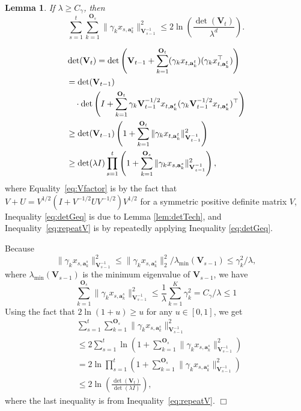 \documentclass{article}
\newcommand{\ba}{\mathbf{a}}
\newcommand{\bO}{\mathbf{O}}
\newcommand{\bV}{\mathbf{V}}
\newcommand{\norm}[1]{\| #1 \|}
\newtheorem{lemma}[theorem]{Lemma}%
\newenvironment{proof}{\noindent {\textbf{Proof. }}}{$\Box$ \medskip}
\begin{document}
\begin{lemma}
\label{lem:SumXiEstimateInDet}
If $\lambda \geq C_\gamma$, then
$$
\sum_{s=1}^t \sum_{k=1}^{\bO_s} \norm{\gamma_k x_{s,\ba_{k}^s}}_{\bV_{s-1}^{-1}}^2 \leq 2\ln \left(\frac{\det(\bV_t)}{\lambda^d} \right).
$$
\end{lemma}
\begin{proof}
\begin{align}
&\det(\bV_t) = \det\left(\bV_{t-1} + \sum_{k=1}^{\bO_t} (\gamma_k x_{t,\ba_k^{t}})(\gamma_k x_{t, \ba_k^{t}}^{\top}) \right) \nonumber \\
&=\det(\bV_{t-1}) \notag \\
&~~~\cdot \det \left(I + \sum_{k=1}^{\bO_t} \gamma_k \bV_{t-1}^{-1/2}x_{t,\ba_{k}^{t}} (\gamma_k \bV_{t-1}^{-1/2}x_{t,\ba_{k}^{t}})^{\top} \right) \label{eq:Vfactor}\\
&\geq \det(\bV_{t-1}) \left(1 + \sum_{k=1}^{\bO_t} \norm{\gamma_k x_{t,\ba_k^t}}_{\bV_{t-1}^{-1}}^2 \right) \label{eq:detGeq} \\
&\geq \det(\lambda I)\prod_{s=1}^{t} \left(1 + \sum_{k=1}^{\bO_s} \norm{\gamma_k x_{s,\ba_k^s}}_{\bV_{s-1}^{-1}}^2 \right), \label{eq:repeatV}
\end{align}
where Equality~\eqref{eq:Vfactor} is by the fact that
	$V+U = V^{1/2} (I + V^{-1/2} U V^{-1/2}) V^{1/2}$ for a symmetric positive definite
	matrix $V$, Inequality \eqref{eq:detGeq} is due to Lemma \ref{lem:detTech}, and
	Inequality~\eqref{eq:repeatV} is by repeatedly applying Inequality
	\eqref{eq:detGeq}.

Because
$$
\norm{\gamma_k x_{s,\ba_k^s}}_{\bV_{s-1}^{-1}}^2 \leq \norm{\gamma_k x_{s,\ba_k^s}}_2^2/\lambda_{\min}(\bV_{s-1}) \leq \gamma_k^2 /\lambda,
$$
where $\lambda_{\min}(\bV_{s-1})$ is the minimum eigenvalue of
	$\bV_{s-1}$,  we have 
$$
\sum_{k=1}^{\bO_s} \norm{\gamma_k x_{s,\ba_k^s}}_{\bV_{s-1}^{-1}}^2 \leq \frac{1}{\lambda} \sum_{k=1}^{K} \gamma_k^2 = C_\gamma /\lambda \leq 1
$$
Using the fact that $ 2\ln(1+u) \geq u$ for any $u \in [0,1]$, we get
\begin{align*}
&\sum_{s=1}^t \sum_{k=1}^{\bO_s}\norm{\gamma_k x_{s,\ba_{k}^s}}_{\bV_{s-1}^{-1}}^2 \\
&\leq 2\sum_{s=1}^t\ln \left(1 + \sum_{k=1}^{\bO_s} \norm{\gamma_k x_{s,\ba_k^s}}_{\bV_{s-1}^{-1}}^2 \right)\\
& = 2 \ln \prod_{s=1}^{t} \left(1 + \sum_{k=1}^{\bO_s} \norm{\gamma_k x_{s,\ba_k^s}}_{\bV_{s-1}^{-1}}^2 \right) \\
&\le 2 \ln \left(\frac{\det(\bV_t)}{\det(\lambda I)} \right),
\end{align*}
where the last inequality is from Inequality~\eqref{eq:repeatV}.
\end{proof}
\end{document}
